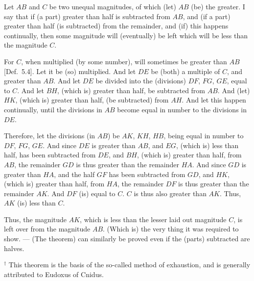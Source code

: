 \begin{Parallel}{}{}
{Let $AB$ and $C$ be two unequal magnitudes, of which (let) $AB$ (be) the greater. I say that if (a part) greater than half is subtracted  from $AB$,
and (if a part) greater than half (is subtracted) from the remainder, and (if) this happens
continually, then some magnitude will (eventually) be left which will be less
than the magnitude $C$. 

\epsfysize=1.1in
\centerline{}

For $C$, when multiplied (by some number), will sometimes be greater than $AB$ [Def.~5.4]. Let it 
 be (so) multiplied. And let $DE$ be (both) a multiple of $C$, and greater
than $AB$. And let $DE$ be divided into the (divisions) $DF$, $FG$,
$GE$, equal to $C$. And   let $BH$, (which is) greater than half, be subtracted from $AB$. And  (let) $HK$, (which is) greater than half, (be subtracted) from $AH$. And let this happen continually, until the divisions in
$AB$ become equal in number to the divisions in $DE$.

Therefore, let the divisions (in $AB$) be $AK$, $KH$, $HB$, being equal in number to $DF$, $FG$, $GE$.  And since $DE$ is greater than $AB$, and $EG$, (which is) less than half, has been subtracted from $DE$, and $BH$, (which is) greater
than half, from $AB$, the remainder $GD$ is thus greater than the remainder
$HA$. And since $GD$ is greater than $HA$, and the half $GF$ has been
subtracted from $GD$, and $HK$, (which is) greater than half, from $HA$,
the remainder $DF$ is thus greater than the remainder $AK$. And $DF$
(is) equal to $C$. $C$ is thus also greater than $AK$.
Thus, $AK$ (is) less than $C$.

Thus, the magnitude $AK$,  which is less
than the lesser laid out magnitude $C$, is left over from the magnitude $AB$. (Which is) the very thing it was required to show. --- (The theorem) can similarly be proved even if  the
(parts) subtracted are halves.}
\end{Parallel}
{\footnotesize\noindent $^\dag$ This theorem is the basis of the so-called {\rm method of exhaustion}, and is generally attributed to Eudoxus of Cnidus.}

